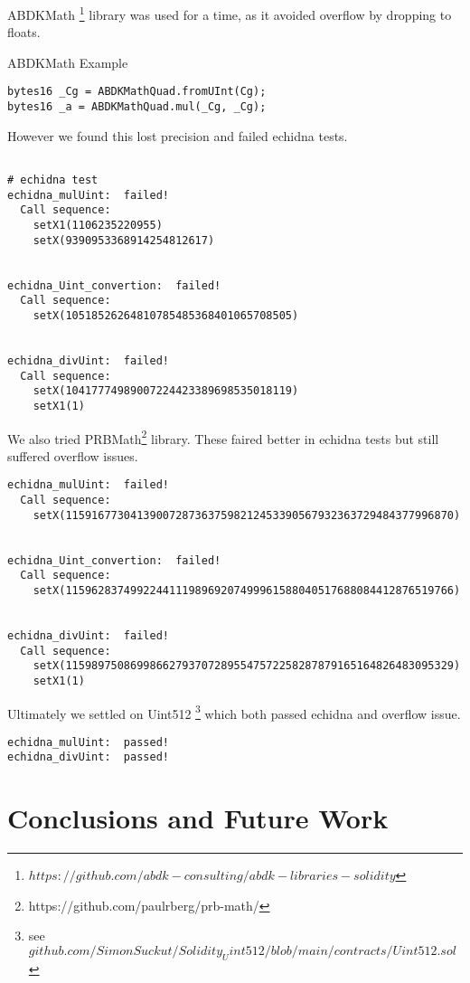 \documentclass[runningheads]{llncs}
\begin{document}
ABDKMath \footnote{$https://github.com/abdk-consulting/abdk-libraries-solidity$} library was used for a time, as it avoided overflow by dropping to floats.

ABDKMath Example
\begin{verbatim}
bytes16 _Cg = ABDKMathQuad.fromUInt(Cg);
bytes16 _a = ABDKMathQuad.mul(_Cg, _Cg);
\end{verbatim}

However we found this lost precision and failed echidna tests.
\label{Uint256 overflow:5}
\begin{lstlisting}

# echidna test
echidna_mulUint:  failed!
  Call sequence:
    setX1(1106235220955)
    setX(9390953368914254812617)


echidna_Uint_convertion:  failed!
  Call sequence:
    setX(10518526264810785485368401065708505)


echidna_divUint:  failed!
  Call sequence:
    setX(10417774989007224423389698535018119)
    setX1(1)
\end{lstlisting}


We also tried PRBMath\footnote{https://github.com/paulrberg/prb-math/} library. These faired better in echidna tests but still suffered overflow issues. 

\begin{lstlisting}
echidna_mulUint:  failed!
  Call sequence:
    setX(115916773041390072873637598212453390567932363729484377996870)


echidna_Uint_convertion:  failed!
  Call sequence:
    setX(115962837499224411198969207499961588040517688084412876519766)


echidna_divUint:  failed!
  Call sequence:
    setX(115989750869986627937072895547572258287879165164826483095329)
    setX1(1)
\end{lstlisting}


Ultimately we settled on Uint512 \footnote{see $github.com/SimonSuckut/Solidity_Uint512/blob/main/contracts/Uint512.sol$} which both passed echidna and overflow issue.
\begin{lstlisting}
echidna_mulUint:  passed! 
echidna_divUint:  passed!
\end{lstlisting}



\chapter{Conclusions and Future Work}
\end{document}
